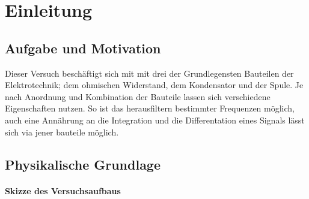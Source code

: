 \chapter{Einleitung} \label{ch:Einleitung}

\section{Aufgabe und Motivation}
\label{sec:AuM}
Dieser Versuch beschäftigt sich mit mit drei der Grundlegensten Bauteilen der Elektrotechnik; dem ohmischen Widerstand, dem Kondensator und der Spule. Je nach Anordnung und Kombination der Bauteile lassen sich verschiedene Eigenschaften nutzen. So ist das herausfiltern bestimmter Frequenzen möglich, auch eine Annährung an die Integration und die Differentation eines Signals lässt sich via jener bauteile möglich.

\section{Physikalische Grundlage}
\label{sec:PhyBasics}


\subsubsection*{Skizze des Versuchsaufbaus}
\label{sec:Skizze}

